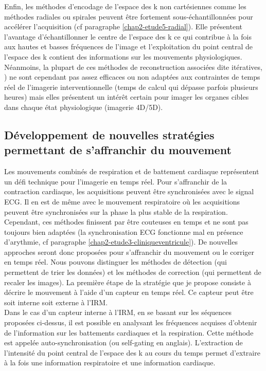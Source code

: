 \documentclass[10pt,a4paper]{report}
\begin{document}
Enfin, les méthodes d’encodage de l’espace des k non cartésiennes comme les méthodes radiales ou spirales \cite{wright20143d} peuvent être fortement sous-échantillonnées pour accélérer l’acquisition (cf paragraphe \ref{chap2-etude5-radial}). Elle présentent l’avantage d’échantillonner le centre de l’espace des k ce qui contribue à la fois aux hautes et basses fréquences de l’image et l’exploitation du point central de l’espace des k contient des informations sur les mouvements physiologiques. Néanmoins, la plupart de ces méthodes de reconstruction associées dite itératives, \cite{lustig2007sparse}) ne sont cependant pas assez efficaces ou non adaptées aux contraintes de temps réel de l’imagerie interventionnelle (temps de calcul qui dépasse parfois plusieurs heures) mais elles présentent un intérêt certain pour imager les organes cibles dans chaque état physiologique (imagerie 4D/5D). 

\subsection{Développement de nouvelles stratégies permettant de s'affranchir du mouvement}

Les mouvements combinés de respiration et de battement cardiaque représentent un défi technique pour l’imagerie en temps réel. Pour s’affranchir de la contraction cardiaque, les acquisitions peuvent être synchronisées avec le signal \ac{ECG}. Il en est de même avec le mouvement respiratoire où les acquisitions peuvent être synchronisées sur la phase la plus stable de la respiration. Cependant, ces méthodes finissent par être couteuses en temps et ne sont pas toujours bien adaptées (la synchronisation ECG fonctionne mal en présence d’arythmie, cf paragraphe \ref{chap2-etude3-cliniqueventricule}). De nouvelles approches seront donc proposées pour s’affranchir du mouvement ou le corriger en temps réel. Nous pouvons distinguer les méthodes de détection (qui permettent de trier les données) et les méthodes de correction (qui permettent de recaler les images). La première étape de la stratégie que je propose consiste à décrire le mouvement à l’aide d'un capteur en temps réel. Ce capteur peut être soit interne soit externe à l’IRM.\\

Dans le cas d’un capteur interne à l’IRM, en se basant sur les séquences proposées ci-dessus, il est possible en analysant les fréquences acquises d’obtenir de l’information sur les battements cardiaques et la respiration. Cette méthode est appelée auto-synchronisation (ou self-gating en anglais). L’extraction de l’intensité du point central de l’espace des k au cours du temps permet d’extraire à la fois une information respiratoire et une information cardiaque.\\
\end{document}
